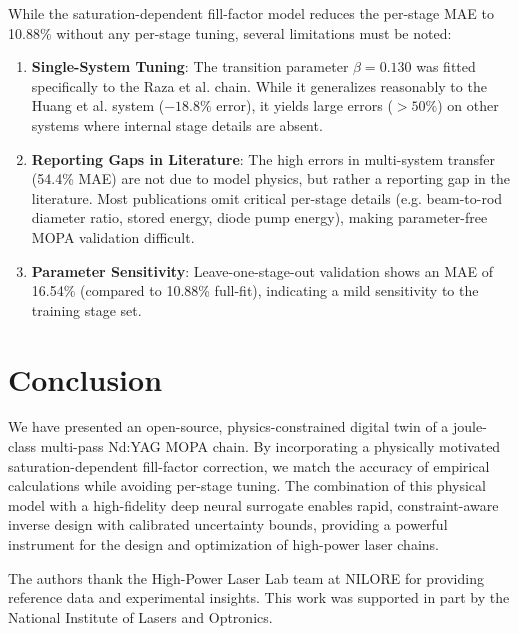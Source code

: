 \documentclass[aps,reprint,twocolumn,amsmath,amssymb,graphicx,nofootinbib]{revtex4-2}
\begin{document}
While the saturation-dependent fill-factor model reduces the per-stage MAE to 10.88\% without any per-stage tuning, several limitations must be noted:
\begin{enumerate}
    \item \textbf{Single-System Tuning}: The transition parameter $\beta = 0.130$ was fitted specifically to the Raza et al. chain. While it generalizes reasonably to the Huang et al. system ($-18.8\%$ error), it yields large errors ($>50\%$) on other systems where internal stage details are absent.
    \item \textbf{Reporting Gaps in Literature}: The high errors in multi-system transfer (54.4\% MAE) are not due to model physics, but rather a reporting gap in the literature. Most publications omit critical per-stage details (e.g. beam-to-rod diameter ratio, stored energy, diode pump energy), making parameter-free MOPA validation difficult.
    \item \textbf{Parameter Sensitivity}: Leave-one-stage-out validation shows an MAE of 16.54\% (compared to 10.88\% full-fit), indicating a mild sensitivity to the training stage set.
\end{enumerate}

\section{Conclusion}

We have presented an open-source, physics-constrained digital twin of a joule-class multi-pass Nd:YAG MOPA chain. By incorporating a physically motivated saturation-dependent fill-factor correction, we match the accuracy of empirical calculations while avoiding per-stage tuning. The combination of this physical model with a high-fidelity deep neural surrogate enables rapid, constraint-aware inverse design with calibrated uncertainty bounds, providing a powerful instrument for the design and optimization of high-power laser chains.

\begin{acknowledgments}
The authors thank the High-Power Laser Lab team at NILORE for providing reference data and experimental insights. This work was supported in part by the National Institute of Lasers and Optronics.
\end{acknowledgments}



\end{document}
